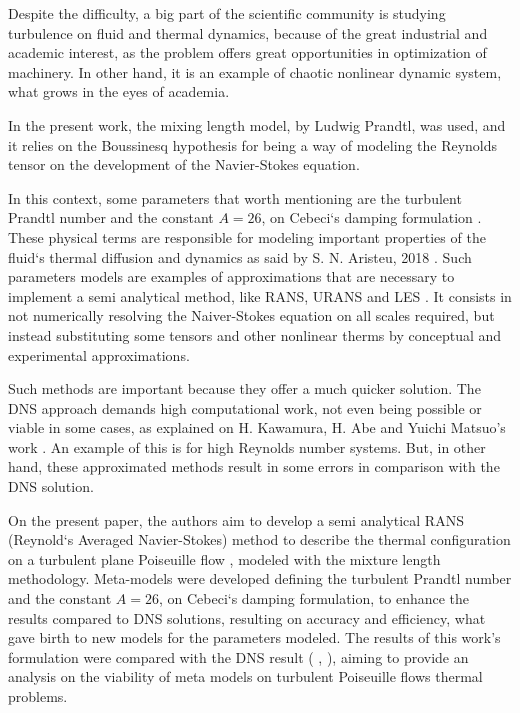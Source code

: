 \documentclass[10pt]{article} %
\begin{document}
Despite the difficulty, a big part of the scientific community is studying turbulence on fluid and thermal dynamics, because of the great industrial and academic interest, as the problem offers great opportunities in optimization of machinery. In other hand, it is an example of chaotic nonlinear dynamic system, what grows in the eyes of academia.   

In the present work, the mixing length model, by Ludwig Prandtl, was used, and it relies on the Boussinesq hypothesis for being a way of modeling the Reynolds tensor on the development of the Navier-Stokes equation.

In this context, some parameters that worth mentioning are the turbulent Prandtl number \cite{Prandtl} and the constant $A = 26$, on Cebeci`s damping formulation \cite{Cebeci}. These physical terms are responsible for modeling important properties of the fluid`s thermal diffusion and dynamics as said by S. N. Aristeu, 2018 \cite{aristeu}. Such parameters models are examples of approximations that are necessary to implement a semi analytical method, like RANS, URANS and LES \cite{aristeu}. It consists in not numerically resolving the Naiver-Stokes equation on all scales required, but instead substituting some tensors and other nonlinear therms by conceptual and experimental approximations.

Such methods are important because they offer a much quicker solution. The DNS approach demands high computational work, not even being possible or viable in some cases, as explained on H. Kawamura, H. Abe and Yuichi Matsuo's work \cite{Abe}. An example of this is for high Reynolds number systems. But, in other hand, these approximated methods result in some errors in comparison with the DNS solution.    

On the present paper, the authors aim to develop a semi analytical RANS (Reynold`s Averaged Navier-Stokes) method to describe the thermal configuration on a turbulent plane Poiseuille flow \cite{Poiseuille}, modeled with the mixture length methodology. Meta-models were developed defining the turbulent Prandtl number \cite{Prandtl} and the constant $A = 26$, on Cebeci`s damping formulation, to enhance the results compared to DNS solutions, resulting on accuracy and efficiency, what gave birth to new models for the parameters modeled. The results of this work's formulation were compared with the DNS result (\cite{DNS1020} , \cite{DNS150}), aiming to provide an analysis on the viability of meta models on turbulent Poiseuille flows thermal problems. \\       
 
\end{document}
